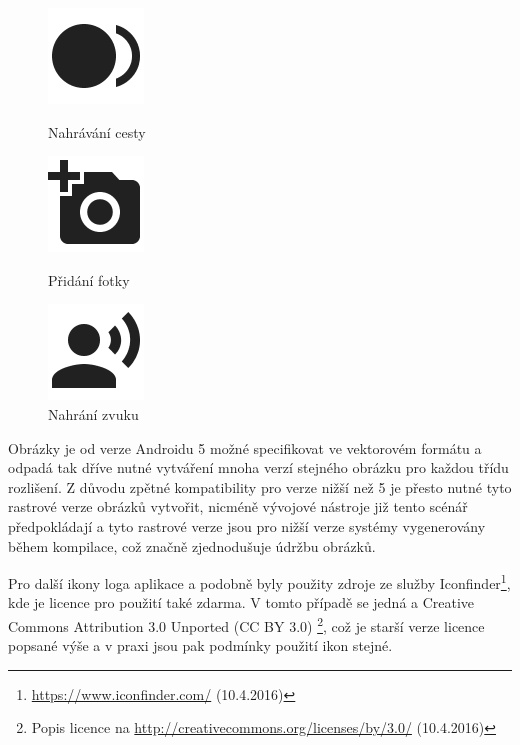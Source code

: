 \documentclass[czech,master,public,dept460,male,java,cpdeclaration]{diploma}
\begin{document}
\begin{figure}[H]
  \centering
  \includegraphics[scale=0.2]{img/record.png}
  \caption{Nahrávání cesty}\label{fig:record}
\endminipage\hfill
{}
  \centering
  \includegraphics[scale=0.2]{img/camera.png}
  \caption{Přidání fotky}\label{fig:camera}
\endminipage\hfill
{}%
  \centering
  \includegraphics[scale=0.2]{img/recordsound.png}
  \caption{Nahrání zvuku}\label{fig:recordsound}
\endminipage
\end{figure}

Obrázky je od verze Androidu 5 možné specifikovat ve vektorovém formátu a odpadá tak dříve
nutné vytváření mnoha verzí stejného obrázku pro každou třídu rozlišení.
Z důvodu zpětné kompatibility pro verze nižší než 5 je přesto nutné tyto rastrové verze obrázků
vytvořit, nicméně vývojové nástroje již tento scénář předpokládají a tyto rastrové verze jsou
pro nižší verze systémy vygenerovány během kompilace, což značně zjednodušuje údržbu obrázků.



Pro další ikony loga aplikace a podobně byly použity zdroje ze služby
Iconfinder\footnote{\url{https://www.iconfinder.com/}  (10.4.2016)}, kde je licence pro použití také zdarma. V tomto
případě se jedná a Creative Commons Attribution 3.0 Unported (CC BY 3.0)
\footnote{Popis licence na \url{http://creativecommons.org/licenses/by/3.0/}  (10.4.2016)}, což je starší verze
licence popsané výše a v praxi jsou pak podmínky použití ikon stejné.




\end{document}
